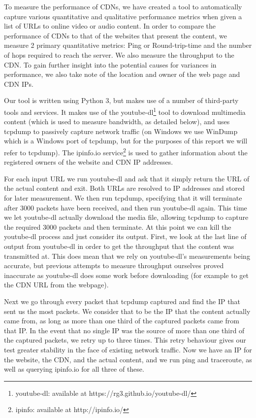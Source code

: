 \documentclass{sig-alternate-05-2015}
\begin{document}
To measure the performance of CDNs, we have created a tool to automatically capture various quantitative and qualitative performance metrics when given a list of URLs to online video or audio content. In order to compare the performance of CDNs to that of the websites that present the content, we measure 2 primary quantitative metrics: Ping or Round-trip-time and the number of hops required to reach the server. We also measure the throughput to the CDN. To gain further insight into the potential causes for variances in performance, we also take note of the location and owner of the web page and CDN IPs.

Our tool is written using Python 3, but makes use of a number of third-party tools and services. It makes use of the youtube-dl\footnote{youtube-dl: available at https://rg3.github.io/youtube-dl/} tool to download multimedia content (which is used to measure bandwidth, as detailed below), and uses tcpdump to passively capture network traffic (on Windows we use WinDump which is a Windows port of tcpdump, but for the purposes of this report we will refer to tcpdump). The ipinfo.io service\footnote{ipinfo: available at http://ipinfo.io/} is used to gather information about the registered owners of the website and CDN IP addresses.

For each input URL we run youtube-dl and ask that it simply return the URL of the actual content and exit. Both URLs are resolved to IP addresses and stored for later measurement. We then run tcpdump, specifying that it will terminate after 3000 packets have been received, and then run youtube-dl again. This time we let youtube-dl actually download the media file, allowing tcpdump to capture the required 3000 packets and then terminate. At this point we can kill the youtube-dl process and just consider its output. First, we look at the last line of output from youtube-dl in order to get the throughput that the content was transmitted at. This does mean that we rely on youtube-dl's measurements being accurate, but previous attempts to measure throughput ourselves proved inaccurate as youtube-dl does some work before downloading (for example to get the CDN URL from the webpage).

Next we go through every packet that tcpdump captured and find the IP that sent us the most packets. We consider that to be the IP that the content actually came from, as long as more than one third of the captured packets came from that IP. In the event that no single IP was the source of more than one third of the captured packets, we retry up to three times. This retry behaviour gives our test greater stability in the face of existing network traffic. Now we have an IP for the website, the CDN, and the actual content, and we run ping and traceroute, as well as querying ipinfo.io for all three of these.
\end{document}
